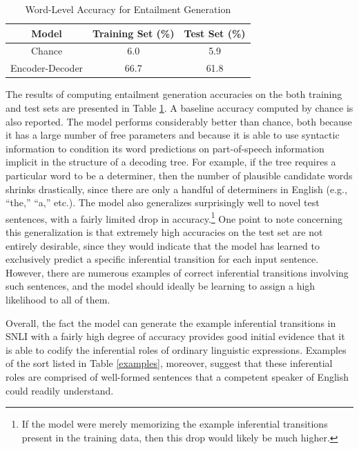 \begin{table}[!t]
\begin{center} 
\caption{Word-Level Accuracy for Entailment Generation} 
\label{accuracy} 
\vskip 0.12in
\begin{tabular}{c c c} 
\hline
Model  &  Training Set (\%)  & Test Set (\%)\\
\hline
\rule{0pt}{3ex}Chance  &  6.0 &  5.9 \\
Encoder-Decoder  &  66.7 & 61.8  \\
\hline
\end{tabular} 
\end{center} 
\end{table}

The results of computing entailment generation accuracies on the both training and test sets are presented in Table \ref{accuracy}. A baseline accuracy computed by chance is also reported. The model performs considerably better than chance, both because it has a large number of free parameters and because it is able to use syntactic information to condition its word predictions on part-of-speech information implicit in the structure of a decoding tree. For example, if the tree requires a particular word to be a determiner, then the number of plausible candidate words shrinks drastically, since there are only a handful of determiners in English (e.g., ``the,'' ``a,'' etc.). The model also generalizes surprisingly well to novel test sentences, with a fairly limited drop in accuracy.\footnote{If the model were merely memorizing the example inferential transitions present in the training data, then this drop would likely be much higher.} One point to note concerning this generalization is that extremely high accuracies on the test set are not entirely desirable, since they would indicate that the model has learned to exclusively predict a specific inferential transition for each input sentence. However, there are numerous examples of correct inferential transitions involving such sentences, and the model should ideally be learning to assign a high likelihood to all of them.  

Overall, the fact the model can generate the example inferential transitions in SNLI with a fairly high degree of accuracy provides good initial evidence that it is able to codify the inferential roles of ordinary linguistic expressions. Examples of the sort listed in Table \ref{examples}, moreover, suggest that these inferential roles are comprised of well-formed sentences that a competent speaker of English could readily understand. 

